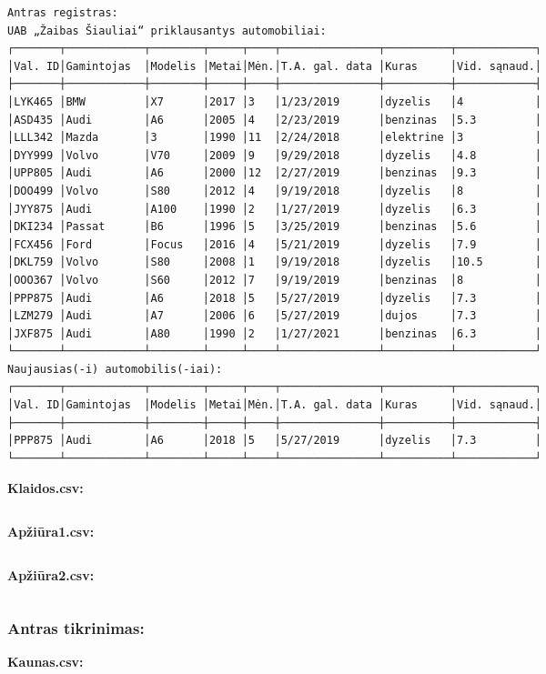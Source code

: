 \documentclass{article}
\begin{document}
\begin{verbatim}
Antras registras:
UAB „Žaibas Šiauliai“ priklausantys automobiliai:
┌───────┬────────────┬────────┬─────┬────┬───────────────┬──────────┬────────────┐
│Val. ID│Gamintojas  │Modelis │Metai│Mėn.│T.A. gal. data │Kuras     │Vid. sąnaud.│
├───────┼────────────┼────────┼─────┼────┼───────────────┼──────────┼────────────┤
│LYK465 │BMW         │X7      │2017 │3   │1/23/2019      │dyzelis   │4           │
│ASD435 │Audi        │A6      │2005 │4   │2/23/2019      │benzinas  │5.3         │
│LLL342 │Mazda       │3       │1990 │11  │2/24/2018      │elektrine │3           │
│DYY999 │Volvo       │V70     │2009 │9   │9/29/2018      │dyzelis   │4.8         │
│UPP805 │Audi        │A6      │2000 │12  │2/27/2019      │benzinas  │9.3         │
│DOO499 │Volvo       │S80     │2012 │4   │9/19/2018      │dyzelis   │8           │
│JYY875 │Audi        │A100    │1990 │2   │1/27/2019      │dyzelis   │6.3         │
│DKI234 │Passat      │B6      │1996 │5   │3/25/2019      │benzinas  │5.6         │
│FCX456 │Ford        │Focus   │2016 │4   │5/21/2019      │dyzelis   │7.9         │
│DKL759 │Volvo       │S80     │2008 │1   │9/19/2018      │dyzelis   │10.5        │
│OOO367 │Volvo       │S60     │2012 │7   │9/19/2019      │benzinas  │8           │
│PPP875 │Audi        │A6      │2018 │5   │5/27/2019      │dyzelis   │7.3         │
│LZM279 │Audi        │A7      │2006 │6   │5/27/2019      │dujos     │7.3         │
│JXF875 │Audi        │A80     │1990 │2   │1/27/2021      │benzinas  │6.3         │
└───────┴────────────┴────────┴─────┴────┴───────────────┴──────────┴────────────┘
Naujausias(-i) automobilis(-iai):
┌───────┬────────────┬────────┬─────┬────┬───────────────┬──────────┬────────────┐
│Val. ID│Gamintojas  │Modelis │Metai│Mėn.│T.A. gal. data │Kuras     │Vid. sąnaud.│
├───────┼────────────┼────────┼─────┼────┼───────────────┼──────────┼────────────┤
│PPP875 │Audi        │A6      │2018 │5   │5/27/2019      │dyzelis   │7.3         │
└───────┴────────────┴────────┴─────┴────┴───────────────┴──────────┴────────────┘
\end{verbatim}
\normalsize

\textbf{Klaidos.csv:}
\inputminted{csharp}{Assets/L3/klaidos1.csv}

\textbf{Apžiūra1.csv:}
\inputminted{csharp}{Assets/L3/apziura1-1.csv}

\textbf{Apžiūra2.csv:}
\inputminted{csharp}{Assets/L3/apziura1-2.csv}

\subsubsection{Antras tikrinimas:}
\begin{changemargin}{0cm}{0cm}
    \textbf{Kaunas.csv:}
\end{changemargin}
\end{document}
